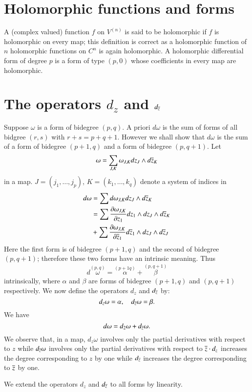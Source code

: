 \section*{Holomorphic functions and forms}

\pageoriginale
A (complex valued) function $f$ on $V^{(n)}$ is said to be holomorphic
if $f$ is holomorphic on every map; this definition is correct as a
holomorphic function of $n$ holomorphic functions on $C^{n}$ is again
holomorphic. A holomorphic differential form of degree $p$ is a form
of type $(p,0)$ whose coefficients in every map are holomorphic.

\section*{The operators $d_{z}$ and $d_{\overline{z}}$}

Suppose $\omega$ is a form of bidegree $(p,q)$. A priori $d\omega$ is
the sum of forms of all bidgree $(r,s)$ with $r+s=p+q+1$. However we
shall show that $d\omega$ is the sum of a form of bidegree $(p+1,q)$
and a form of bidegree $(p,q+1)$. Let 
$$
\omega=\sum_{J,K}\omega_{J,K}dz_{J}\wedge d\overline{z}_{K}
$$
in a map. $J=(j_{1},\ldots,j_{p})$, $K=(k_{1},\ldots,k_{q})$ denote a
system of indices in 
\begin{align*}
d\omega &= \sum d\omega_{J,K} dz_{J}\wedge d\overline{z}_{K}\\
&= \sum\frac{\partial \omega_{J,K}}{\partial z_{1}}dz_{1}\wedge
dz_{J}\wedge d\overline{z}_{K}\\
& + \sum\frac{\partial \omega_{J,K}}{\partial
  \overline{z}_{1}}d\overline{z}_{1}\wedge dz_{J}\wedge d\overline{z}_{J} 
\end{align*}
Here the first form is of bidegree $(p+1,q)$ and the second of
bidegree $(p,q+1)$; therefore these two forms have an intrinsic
meaning. Thus\pageoriginale
$$
d\overset{(p,q)}{\omega}=\overset{(p+1q)}{\alpha}+\overset{(p,q+1)}{\beta}
$$
intrinsically, where $\alpha$ and $\beta$ are forms of bidegree
$(p+1,q)$ and $(p,q+1)$ respectively. We now define the operators
$d_{z}$ and $d_{\overline{z}}$ by:
$$
d_{z}\omega=\alpha,\quad d_{\overline{z}}\omega=\beta.
$$
We have
$$
d\omega=d_{2}\omega+d_{\overline{z}}\omega.
$$
We observe that, in a map, $d_{z}\omega$ involves only the partial
derivatives with respect to $z$ while $d_{\overline{z}}\omega$ involves only
the partial derivatives with respect to $\overline{z}\cdot d_{z}$ increases
the degree corresponding to $z$ by one while $d_{\overline{z}}$ increases
the degree corresponding to $\overline{z}$ by one.

We extend the operators $d_{z}$ and $d_{\overline{z}}$ to all forms by
linearity.

